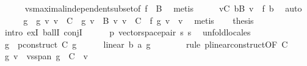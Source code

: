 \begin{isabellebody}
\ \ \ \ \isamarkupfalse%
\ vs{}{\isachardot}{\kern0pt}maximal{\isacharunderscore}{\kern0pt}independent{\isacharunderscore}{\kern0pt}subset{\isacharbrackleft}{\kern0pt}of\ {\isachardoublequoteopen}f\ {\isacharbackquote}{\kern0pt}\ B{\isachardoublequoteclose}{\isacharbrackright}{\kern0pt}\ \isamarkupfalse%
\ metis\isanewline
\ \ \isamarkupfalse%
\ \isamarkupfalse%
\ {\isachardoublequoteopen}{\isasymforall}v{\isasymin}C{\isachardot}{\kern0pt}\ {\isasymexists}b{\isasymin}B{\isachardot}{\kern0pt}\ v\ {\isacharequal}{\kern0pt}\ f\ b{\isachardoublequoteclose}\ \isamarkupfalse%
\ auto\isanewline
\ \ \isamarkupfalse%
\ \isamarkupfalse%
\ g\ \ g{\isacharcolon}{\kern0pt}\ {\isachardoublequoteopen}{\isasymAnd}v{\isachardot}{\kern0pt}\ v\ {\isasymin}\ C\ {\isasymLongrightarrow}\ g\ v\ {\isasymin}\ B{\isachardoublequoteclose}\ {\isachardoublequoteopen}{\isasymAnd}v{\isachardot}{\kern0pt}\ v\ {\isasymin}\ C\ {\isasymLongrightarrow}\ f\ {\isacharparenleft}{\kern0pt}g\ v{\isacharparenright}{\kern0pt}\ {\isacharequal}{\kern0pt}\ v{\isachardoublequoteclose}\ \isamarkupfalse%
\ metis\isanewline
\ \ \isamarkupfalse%
\ {\isacharquery}{\kern0pt}thesis\isanewline
\ \ \isamarkupfalse%
\ {\isacharparenleft}{\kern0pt}intro\ exI\ ballI\ conjI{\isacharparenright}{\kern0pt}\isanewline
\ \ \ \ \isamarkupfalse%
\ p{\isacharcolon}{\kern0pt}\ vector{\isacharunderscore}{\kern0pt}space{\isacharunderscore}{\kern0pt}pair\ s{}\ s{}\ \isamarkupfalse%
\ unfold{\isacharunderscore}{\kern0pt}locales\isanewline
\ \ \ \ \isamarkupfalse%
\ {\isacharquery}{\kern0pt}g\ {\isacharequal}{\kern0pt}\ {\isachardoublequoteopen}p{\isachardot}{\kern0pt}construct\ C\ g{\isachardoublequoteclose}\isanewline
\ \ \ \ \isamarkupfalse%
\ {\isachardoublequoteopen}linear\ {\isacharparenleft}{\kern0pt}{\isacharasterisk}{\kern0pt}b{\isacharparenright}{\kern0pt}\ {\isacharparenleft}{\kern0pt}{\isacharasterisk}{\kern0pt}a{\isacharparenright}{\kern0pt}\ {\isacharquery}{\kern0pt}g{\isachardoublequoteclose}\isanewline
\ \ \ \ \ \ \isamarkupfalse%
\ {\isacharparenleft}{\kern0pt}rule\ p{\isachardot}{\kern0pt}linear{\isacharunderscore}{\kern0pt}construct{\isacharbrackleft}{\kern0pt}OF\ C{\isacharbrackright}{\kern0pt}{\isacharparenright}{\kern0pt}\isanewline
\ \ \ \ \isamarkupfalse%
\ {\isachardoublequoteopen}{\isacharquery}{\kern0pt}g\ v\ {\isasymin}\ vs{}{\isachardot}{\kern0pt}span\ {\isacharparenleft}{\kern0pt}g\ {\isacharbackquote}{\kern0pt}\ C{\isacharparenright}{\kern0pt}{\isachardoublequoteclose}\ \ v\isanewline

\end{isabellebody}
